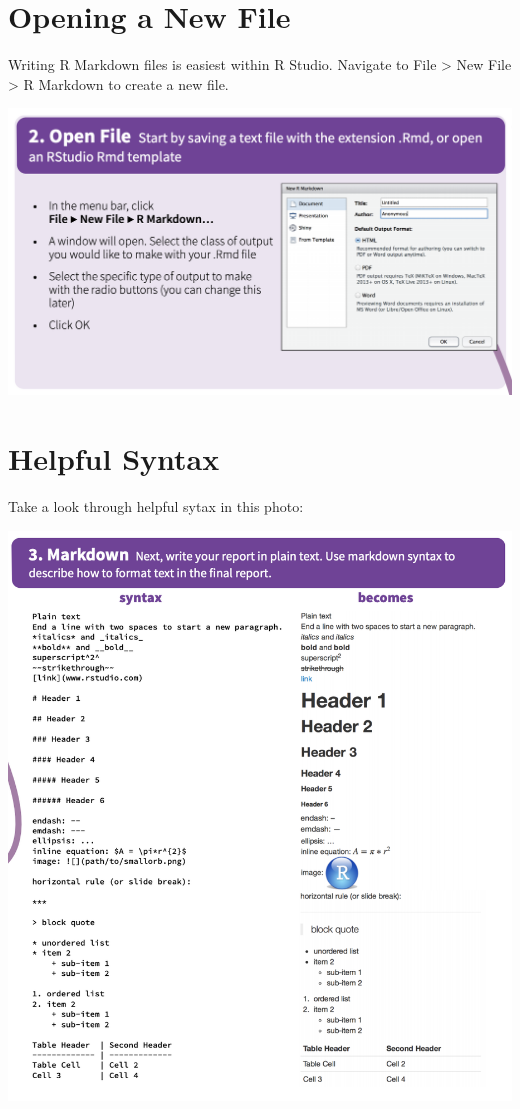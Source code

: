 \documentclass[]{book}
\begin{document}
\hypertarget{opening-a-new-file}{%
\section{Opening a New File}\label{opening-a-new-file}}

Writing R Markdown files is easiest within R Studio. Navigate to File \textgreater{} New File \textgreater{} R Markdown to create a new file.

\includegraphics{images/open.png}

\hypertarget{helpful-syntax}{%
\section{Helpful Syntax}\label{helpful-syntax}}

Take a look through helpful sytax in this photo:

\includegraphics{images/syntax.png}
\end{document}
